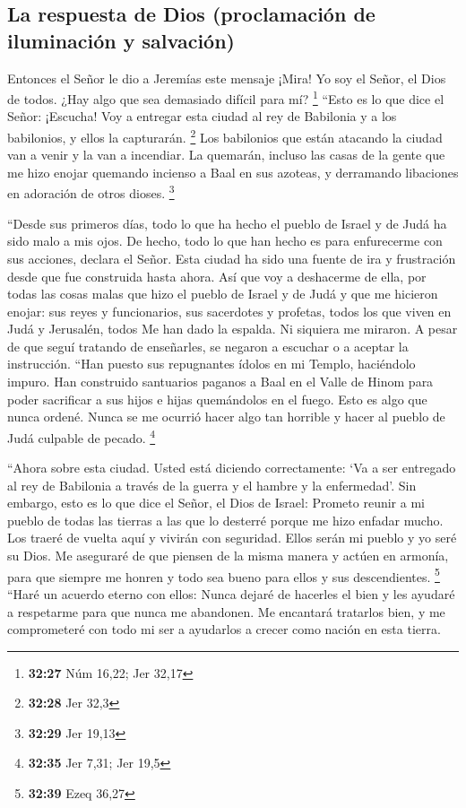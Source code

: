 \hypertarget{la-respuesta-de-dios-proclamaciuxf3n-de-iluminaciuxf3n-y-salvaciuxf3n}{%
\subsection{La respuesta de Dios (proclamación de iluminación y
salvación)}\label{la-respuesta-de-dios-proclamaciuxf3n-de-iluminaciuxf3n-y-salvaciuxf3n}}

 Entonces el Señor le dio a Jeremías este mensaje
 ¡Mira! Yo soy el Señor, el Dios de todos. ¿Hay algo que
sea demasiado difícil para mí? \footnote{\textbf{32:27} Núm 16,22; Jer
  32,17}  ``Esto es lo que dice el Señor: ¡Escucha! Voy a
entregar esta ciudad al rey de Babilonia y a los babilonios, y ellos la
capturarán. \footnote{\textbf{32:28} Jer 32,3}  Los
babilonios que están atacando la ciudad van a venir y la van a
incendiar. La quemarán, incluso las casas de la gente que me hizo enojar
quemando incienso a Baal en sus azoteas, y derramando libaciones en
adoración de otros dioses. \footnote{\textbf{32:29} Jer 19,13}

 ``Desde sus primeros días, todo lo que ha hecho el
pueblo de Israel y de Judá ha sido malo a mis ojos. De hecho, todo lo
que han hecho es para enfurecerme con sus acciones, declara el Señor.
 Esta ciudad ha sido una fuente de ira y frustración
desde que fue construida hasta ahora. Así que voy a deshacerme de ella,
 por todas las cosas malas que hizo el pueblo de Israel y
de Judá y que me hicieron enojar: sus reyes y funcionarios, sus
sacerdotes y profetas, todos los que viven en Judá y Jerusalén, todos
 Me han dado la espalda. Ni siquiera me miraron. A pesar
de que seguí tratando de enseñarles, se negaron a escuchar o a aceptar
la instrucción.  ``Han puesto sus repugnantes ídolos en
mi Templo, haciéndolo impuro.  Han construido santuarios
paganos a Baal en el Valle de Hinom para poder sacrificar a sus hijos e
hijas quemándolos en el fuego. Esto es algo que nunca ordené. Nunca se
me ocurrió hacer algo tan horrible y hacer al pueblo de Judá culpable de
pecado. \footnote{\textbf{32:35} Jer 7,31; Jer 19,5}

 ``Ahora sobre esta ciudad. Usted está diciendo
correctamente: `Va a ser entregado al rey de Babilonia a través de la
guerra y el hambre y la enfermedad'. Sin embargo, esto es lo que dice el
Señor, el Dios de Israel:  Prometo reunir a mi pueblo de
todas las tierras a las que lo desterré porque me hizo enfadar mucho.
Los traeré de vuelta aquí y vivirán con seguridad.  Ellos
serán mi pueblo y yo seré su Dios.  Me aseguraré de que
piensen de la misma manera y actúen en armonía, para que siempre me
honren y todo sea bueno para ellos y sus descendientes. \footnote{\textbf{32:39}
  Ezeq 36,27}  ``Haré un acuerdo eterno con ellos: Nunca
dejaré de hacerles el bien y les ayudaré a respetarme para que nunca me
abandonen.  Me encantará tratarlos bien, y me
comprometeré con todo mi ser a ayudarlos a crecer como nación en esta
tierra.

